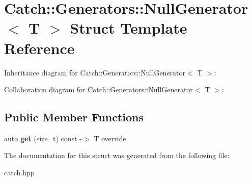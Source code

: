 \hypertarget{structCatch_1_1Generators_1_1NullGenerator}{}\section{Catch\+:\+:Generators\+:\+:Null\+Generator$<$ T $>$ Struct Template Reference}
\label{structCatch_1_1Generators_1_1NullGenerator}


Inheritance diagram for Catch\+:\+:Generators\+:\+:Null\+Generator$<$ T $>$\+:


Collaboration diagram for Catch\+:\+:Generators\+:\+:Null\+Generator$<$ T $>$\+:
\subsection*{Public Member Functions}
\begin{DoxyCompactItemize}
\item 
auto {\bfseries get} (size\+\_\+t) const -\/$>$ T override\hypertarget{structCatch_1_1Generators_1_1NullGenerator_a17a2cc82d644e97afded4017c7a062ef}{}\label{structCatch_1_1Generators_1_1NullGenerator_a17a2cc82d644e97afded4017c7a062ef}

\end{DoxyCompactItemize}


The documentation for this struct was generated from the following file\+:\begin{DoxyCompactItemize}
\item 
catch.\+hpp\end{DoxyCompactItemize}
